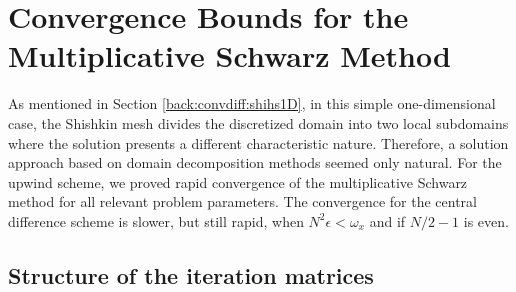 %



\section{Convergence Bounds for the Multiplicative Schwarz Method}\label{1D:bounds}

As mentioned in Section \ref{back:convdiff:shihs1D}, in this simple
one-dimensional case, the Shishkin mesh divides the discretized domain into two
local subdomains where the solution presents a different characteristic nature.
Therefore, a solution approach based on domain decomposition methods seemed
only natural. For the upwind scheme, we proved rapid convergence of the
multiplicative Schwarz method for all relevant problem parameters. The
convergence for the central difference scheme is slower, but still rapid, when
$N^2\epsilon < \omega_x$ and if $N/2-1$ is even.

\subsection{Structure of the iteration matrices}
\label{1D:bounds:structure}


